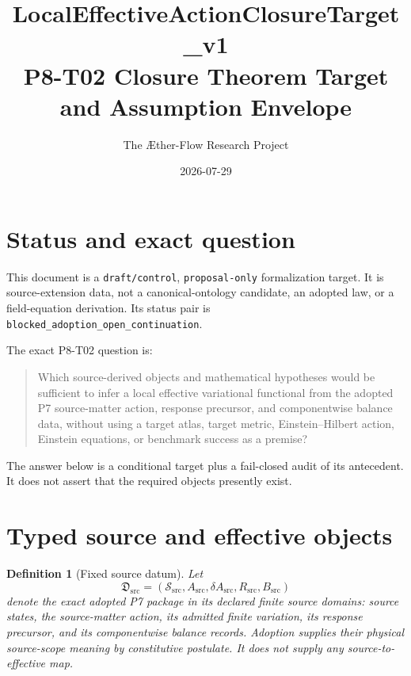 \documentclass[11pt]{article}
\title{LocalEffectiveActionClosureTarget\_v1\\
P8-T02 Closure Theorem Target and Assumption Envelope}
\author{The \AE ther-Flow Research Project}
\date{2026-07-29}
\newtheorem{definition}{Definition}
\newcommand{\Dsrc}{\mathfrak D_{\mathrm{src}}}
\begin{document}
\sloppy
\maketitle

\section{Status and exact question}

This document is a \texttt{draft/control}, \texttt{proposal-only}
formalization target.  It is source-extension data, not a canonical-ontology
candidate, an adopted law, or a field-equation derivation.  Its status pair is
\texttt{blocked\_adoption\_open\_continuation}.

The exact P8-T02 question is:
\begin{quote}
Which source-derived objects and mathematical hypotheses would be sufficient
to infer a local effective variational functional from the adopted P7
source-matter action, response precursor, and componentwise balance data,
without using a target atlas, target metric, Einstein--Hilbert action,
Einstein equations, or benchmark success as a premise?
\end{quote}

The answer below is a conditional target plus a fail-closed audit of its
antecedent.  It does not assert that the required objects presently exist.

\section{Typed source and effective objects}

\begin{definition}[Fixed source datum]
Let
\[
 \Dsrc=(\mathcal S_{\mathrm{src}},A_{\mathrm{src}},
 \delta A_{\mathrm{src}},R_{\mathrm{src}},B_{\mathrm{src}})
\]
denote the exact adopted P7 package in its declared finite source domains:
source states, the source-matter action, its admitted finite variation, its
response precursor, and its componentwise balance records.  Adoption supplies
their physical source-scope meaning by constitutive postulate.  It does not
supply any source-to-effective map.
\end{definition}
\end{document}
